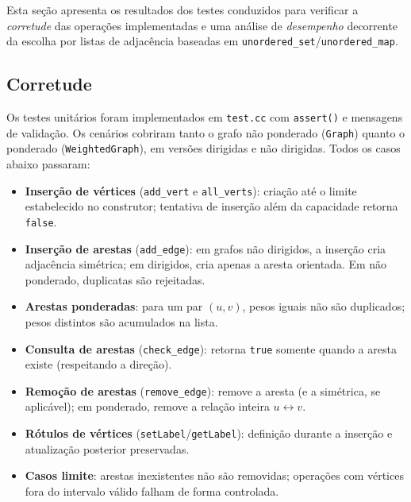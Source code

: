 \documentclass{sbc2023}%
\begin{document}
Esta seção apresenta os resultados dos testes conduzidos para verificar a
\textit{corretude} das operações implementadas e uma análise de
\textit{desempenho} decorrente da escolha por listas de adjacência baseadas em \texttt{unordered\_set}/\texttt{unordered\_map}.

\subsection{Corretude}
Os testes unitários foram implementados em \texttt{test.cc} com
\texttt{assert()} e mensagens de validação. Os cenários cobriram tanto o grafo
não ponderado (\texttt{Graph}) quanto o ponderado (\texttt{WeightedGraph}), em
versões dirigidas e não dirigidas. Todos os casos abaixo passaram:

\begin{itemize}
  \item \textbf{Inserção de vértices} (\texttt{add\_vert} e \texttt{all\_verts}):
        criação até o limite estabelecido no construtor; tentativa de inserção
        além da capacidade retorna \texttt{false}.
  \item \textbf{Inserção de arestas} (\texttt{add\_edge}):
        em grafos não dirigidos, a inserção cria adjacência simétrica;
        em dirigidos, cria apenas a aresta orientada. Em não ponderado,
        duplicatas são rejeitadas.
  \item \textbf{Arestas ponderadas}: para um par \((u,v)\), pesos iguais não
        são duplicados; pesos distintos são acumulados na lista.
  \item \textbf{Consulta de arestas} (\texttt{check\_edge}): retorna
        \texttt{true} somente quando a aresta existe (respeitando a direção).
  \item \textbf{Remoção de arestas} (\texttt{remove\_edge}): remove a aresta
        (e a simétrica, se aplicável); em ponderado, remove a relação inteira
        \(u\leftrightarrow v\).
  \item \textbf{Rótulos de vértices} (\texttt{setLabel}/\texttt{getLabel}):
        definição durante a inserção e atualização posterior preservadas.
  \item \textbf{Casos limite}: arestas inexistentes não são removidas; operações
        com vértices fora do intervalo válido falham de forma controlada.
\end{itemize}
\end{document}
